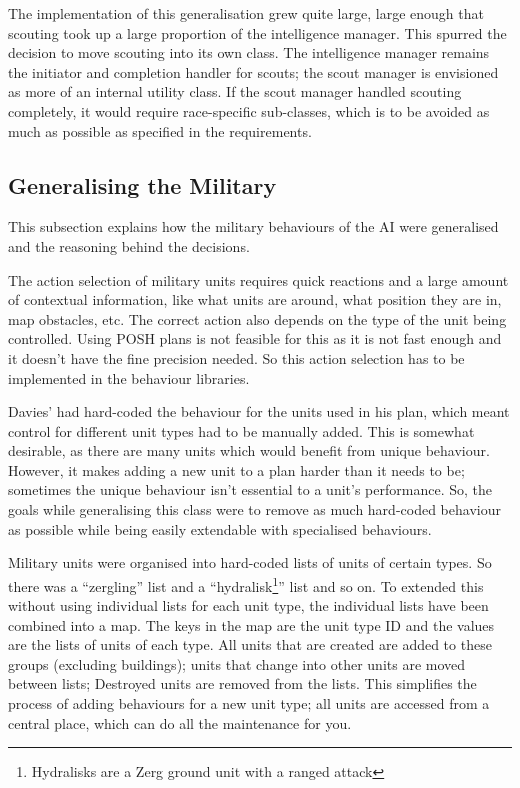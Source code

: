 \documentclass[11pt,openright,a4paper]{report}
\begin{document}
The implementation of this generalisation grew quite large, large enough that scouting took up a large proportion of the intelligence manager. This spurred the decision to move scouting into its own class. The intelligence manager remains the initiator and completion handler for scouts; the scout manager is envisioned as more of an internal utility class. If the scout manager handled scouting completely, it would require race-specific sub-classes, which is to be avoided as much as possible as specified in the requirements.

\subsection{Generalising the Military}
\label{MilitaryGen}
This subsection explains how the military behaviours of the AI were generalised and the reasoning behind the decisions. 

The action selection of military units requires quick reactions and a large amount of contextual information, like what units are around, what position they are in, map obstacles, etc. The correct action also depends on the type of the unit being controlled. Using POSH plans is not feasible for this as it is not fast enough and it doesn't have the fine precision needed. So this action selection has to be implemented in the behaviour libraries. 

Davies' had hard-coded the behaviour for the units used in his plan, which meant control for different unit types had to be manually added. This is somewhat desirable, as there are many units which would benefit from unique behaviour. However, it makes adding a new unit to a plan harder than it needs to be; sometimes the unique behaviour isn't essential to a unit's performance. So, the goals while generalising this class were to remove as much hard-coded behaviour as possible while being easily extendable with specialised behaviours.

Military units were organised into hard-coded lists of units of certain types. So there was a ``zergling'' list and a ``hydralisk\footnote{Hydralisks are a Zerg ground unit with a ranged attack}'' list and so on. To extended this without using individual lists for each unit type, the individual lists have been combined into a map. The keys in the map are the unit type ID and the values are the lists of units of each type. All units that are created are added to these groups (excluding buildings); units that change into other units are moved between lists; Destroyed units are removed from the lists. This simplifies the process of adding behaviours for a new unit type; all units are accessed from a central place, which can do all the maintenance for you.
\end{document}
